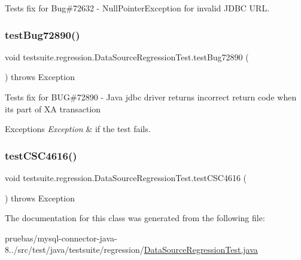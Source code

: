 Tests fix for Bug\#72632 -\/ Null\+Pointer\+Exception for invalid J\+D\+BC U\+RL. \mbox{\label{classtestsuite_1_1regression_1_1_data_source_regression_test_ae91b4203179883e6c257ba0484c9974e}} 
\subsubsection{\texorpdfstring{test\+Bug72890()}{testBug72890()}}
{\footnotesize\ttfamily void testsuite.\+regression.\+Data\+Source\+Regression\+Test.\+test\+Bug72890 (\begin{DoxyParamCaption}{ }\end{DoxyParamCaption}) throws Exception}

Tests fix for B\+UG\#72890 -\/ Java jdbc driver returns incorrect return code when it\textquotesingle{}s part of XA transaction


\begin{DoxyExceptions}{Exceptions}
{\em Exception} & if the test fails. \\
\hline
\end{DoxyExceptions}
\mbox{\label{classtestsuite_1_1regression_1_1_data_source_regression_test_a151cb2069ead1819a419cadc6e3e126b}} 
\subsubsection{\texorpdfstring{test\+C\+S\+C4616()}{testCSC4616()}}
{\footnotesize\ttfamily void testsuite.\+regression.\+Data\+Source\+Regression\+Test.\+test\+C\+S\+C4616 (\begin{DoxyParamCaption}{ }\end{DoxyParamCaption}) throws Exception}



The documentation for this class was generated from the following file\+:\begin{DoxyCompactItemize}
\item 
pruebas/mysql-\/connector-\/java-\/8../src/test/java/testsuite/regression/\mbox{\hyperlink{_data_source_regression_test_8java}{Data\+Source\+Regression\+Test.\+java}}\end{DoxyCompactItemize}
